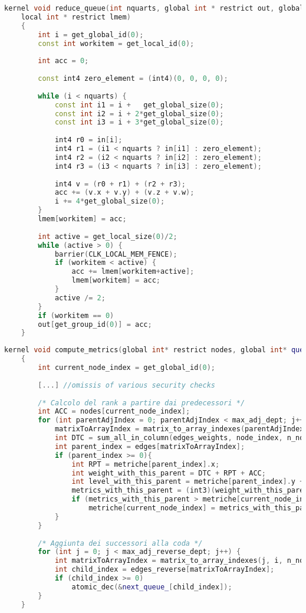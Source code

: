 \begin{lstlisting}[language=C++, caption={compute\_metrics reduction kernel},captionpos=b]
	kernel void reduce_queue(int nquarts, global int * restrict out, global const int4 * restrict in,
	local int * restrict lmem)
	{
		int i = get_global_id(0);
		const int workitem = get_local_id(0);
		
		int acc = 0;
		
		const int4 zero_element = (int4)(0, 0, 0, 0);
		
		while (i < nquarts) {
			const int i1 = i +   get_global_size(0);
			const int i2 = i + 2*get_global_size(0);
			const int i3 = i + 3*get_global_size(0);
			
			int4 r0 = in[i];
			int4 r1 = (i1 < nquarts ? in[i1] : zero_element);
			int4 r2 = (i2 < nquarts ? in[i2] : zero_element);
			int4 r3 = (i3 < nquarts ? in[i3] : zero_element);
			
			int4 v = (r0 + r1) + (r2 + r3);
			acc += (v.x + v.y) + (v.z + v.w);
			i += 4*get_global_size(0);
		}
		lmem[workitem] = acc;
		
		int active = get_local_size(0)/2;
		while (active > 0) {
			barrier(CLK_LOCAL_MEM_FENCE);
			if (workitem < active) {
				acc += lmem[workitem+active];
				lmem[workitem] = acc;
			}
			active /= 2;
		}
		if (workitem == 0)
		out[get_group_id(0)] = acc;
	}
\end{lstlisting}

\begin{lstlisting}[language=C++, caption={compute\_metrics kernel},captionpos=b]
	kernel void compute_metrics(global int* restrict nodes, global int* queue_, global int* next_queue_, global edge_t* restrict edges, global edge_t* restrict edges_reverse, global edge_t* restrict edges_weights, volatile global metrics_tt* metriche, const int max_adj_dept, const int max_adj_reverse_dept, const int n_nodes)
	{
		int current_node_index = get_global_id(0);
		
		[...] //omissis of various security checks
		
		/* Calcolo del rank a partire dai predecessori */
		int ACC = nodes[current_node_index];
		for (int parentAdjIndex = 0; parentAdjIndex < max_adj_dept; j++) {
			matrixToArrayIndex = matrix_to_array_indexes(parentAdjIndex, current_node_index, n_nodes);
			int DTC = sum_all_in_column(edges_weights, node_index, n_nodes);
			int parent_index = edges[matrixToArrayIndex];
			if (parent_index >= 0){
				int RPT = metriche[parent_index].x;
				int weight_with_this_parent = DTC + RPT + ACC;
				int level_with_this_parent = metriche[parent_index].y + 1;
				metrics_with_this_parent = (int3)(weight_with_this_parent, level_with_this_parent, current_node_index);
				if (metrics_with_this_parent > metriche[current_node_index])
					metriche[current_node_index] = metrics_with_this_parent;
			}
		}
	
		/* Aggiunta dei successori alla coda */
		for (int j = 0; j < max_adj_reverse_dept; j++) {
			int matrixToArrayIndex = matrix_to_array_indexes(j, i, n_nodes);
			int child_index = edges_reverse[matrixToArrayIndex];
			if (child_index >= 0)
				atomic_dec(&next_queue_[child_index]);	
		}
	}
\end{lstlisting}

